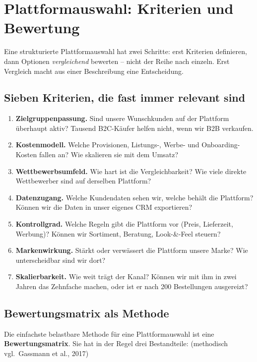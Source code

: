 \documentclass[11pt,a4paper,oneside]{article}
\newcommand{\fachbegriff}[1]{\textbf{#1}}
\newcommand{\quelle}[1]{{\footnotesize\color{lpGray}(#1)}}
\begin{document}
\section{Plattformauswahl: Kriterien und Bewertung}

Eine strukturierte Plattformauswahl hat zwei Schritte: erst Kriterien definieren, dann Optionen \emph{vergleichend} bewerten -- nicht der Reihe nach einzeln. Erst Vergleich macht aus einer Beschreibung eine Entscheidung.

\subsection{Sieben Kriterien, die fast immer relevant sind}

\begin{enumerate}
  \item \textbf{Zielgruppenpassung.} Sind unsere Wunschkunden auf der Plattform überhaupt aktiv? Tausend B2C-Käufer helfen nicht, wenn wir B2B verkaufen.
  \item \textbf{Kostenmodell.} Welche Provisionen, Listungs-, Werbe- und Onboarding-Kosten fallen an? Wie skalieren sie mit dem Umsatz?
  \item \textbf{Wettbewerbsumfeld.} Wie hart ist die Vergleichbarkeit? Wie viele direkte Wettbewerber sind auf derselben Plattform?
  \item \textbf{Datenzugang.} Welche Kundendaten sehen wir, welche behält die Plattform? Können wir die Daten in unser eigenes CRM exportieren?
  \item \textbf{Kontrollgrad.} Welche Regeln gibt die Plattform vor (Preis, Lieferzeit, Werbung)? Können wir Sortiment, Beratung, Look-\&-Feel steuern?
  \item \textbf{Markenwirkung.} Stärkt oder verwässert die Plattform unsere Marke? Wie unterscheidbar sind wir dort?
  \item \textbf{Skalierbarkeit.} Wie weit trägt der Kanal? Können wir mit ihm in zwei Jahren das Zehnfache machen, oder ist er nach 200 Bestellungen ausgereizt?
\end{enumerate}

\subsection{Bewertungsmatrix als Methode}

Die einfachste belastbare Methode für eine Plattformauswahl ist eine \fachbegriff{Bewertungsmatrix}. Sie hat in der Regel drei Bestandteile: \quelle{methodisch vgl.\ Gassmann et al., 2017}
\end{document}
